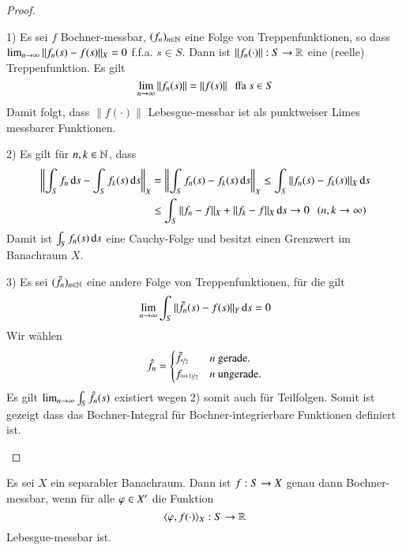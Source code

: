 \begin{proof}
    \begin{description}
        \item{1)}
        Es sei $f$ Bochner-messbar, $(f_n)_{n\in \mathbb{N}}$ eine Folge von Treppenfunktionen, so dass
        $\lim_{n\rightarrow \infty}\|f_n(s)-f(s)\|_X=0$ f.f.a. $s\in S$. Dann ist $\|f_n(\cdot)\|:S\rightarrow \mathbb{R}$ eine
        (reelle) Treppenfunktion. Es gilt
        \[
            \lim_{n\rightarrow\infty} \|f_n(s)\| =\|f(s)\| \hspace{.25cm} \text{ffa } s\in S 
        \]
        Damit folgt, dass $\|f(\cdot)\|$ Lebesgue-messbar ist als punktweiser Limes messbarer Funktionen.
        \item{2)}
        Es gilt für $n,k\in\mathbb{N}$, dass
        \begin{align*}
            \left\|\int_Sf_n\, \mathrm{d} s - \int_Sf_k(s)\, \mathrm{d} s\right\|_X &=\left\| \int_S f_n(s)-f_k(s)\, \mathrm{d} s
                \right\| _X\leq \int_S\|f_n (s)- f_k(s)\|_X\, \mathrm{d} s\\ 
            &\leq \int_S\|f_n-f\|_X + \|f_k-f\|_X \, \mathrm{d} s \rightarrow 0 \hspace{.25cm} (n,k\rightarrow \infty)
        \end{align*}
        Damit ist $\int_S f_n(s)\, \mathrm{d} s$ eine Cauchy-Folge und besitzt einen Grenzwert im Banachraum $X$.
        \item{3)}
        Es sei $(\tilde f _n)_{n\in\mathbb{N}}$ eine andere Folge von Treppenfunktionen, für die gilt
        \[
            \lim_{n\rightarrow \infty} \int_S\|\tilde f_n(s)-f(s)\|_Y \, \mathrm{d} s=0
        \]
        Wir wählen
        \[
            \hat f_n= \begin{cases} \tilde f_{\nicefrac n2} & \text{$n$ gerade.}\\
                      f_{\nicefrac{(n+1)}{2}} & \text{$n$ ungerade.} \end{cases}
        \]
        Es gilt $\lim_{n\rightarrow \infty}\int_S \hat f_n(s)$ existiert wegen 2) somit auch für Teilfolgen.
        Somit ist gezeigt dass das Bochner-Integral für Bochner-integrierbare Funktionen definiert ist.

    \end{description}
    \[ \]
\end{proof}

\begin{theorem}[Pettis]\label{4.24}
    Es sei $X$ ein separabler Banachraum. Dann ist $f:S\rightarrow X$ genau dann Bochner-messbar, wenn für alle
    $\varphi \in X'$ die Funktion
    \[
        \langle \varphi,f(\cdot)\rangle_X:S\rightarrow \mathbb{R}
    \]
    Lebesgue-messbar ist.
\end{theorem}

